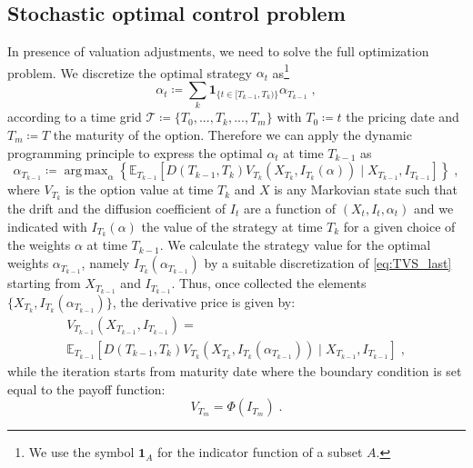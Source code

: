 \documentclass[runningheads]{m2ef}
\DeclareMathOperator*{\argmax}{arg\,max}
\begin{document}
	\subsection{Stochastic optimal control problem}
	In presence of valuation adjustments, we need to solve the full optimization problem. We discretize the optimal strategy $\alpha_t$ as\footnote{We use the symbol $\mathbf{1}_A$ for the indicator function of a subset $A$.}
	\begin{equation}
		\alpha_t \coloneqq \sum_k \mathbf{1}_{ \{t \in [T_{k-1}, T_k)\}}\alpha_{T_{k-1}} \; ,
	\label{eq:piecewise_strategy}\end{equation}
	according to a time grid $\mathcal{T}\coloneqq \{T_0,...,T_k,...,T_m\}$ with $T_0\coloneqq t$ the pricing date and $T_m \coloneqq T$ the maturity of the option. 
	Therefore we can apply the dynamic programming principle to express the optimal $\alpha_t$ at time $T_{k-1}$ as
	\begin{equation}
		\alpha_{T_{k-1}}\coloneqq \argmax_{\alpha} \left\{\mathbb{E}_{T_{k-1}}\left[D\left(T_{k-1},T_{k} \right) V_{T_{k}}\left(X_{T_{k}}, I_{T_{k}}(\alpha)\right) \mid X_{T_{k-1}}, I_{T_{k-1}}\right]\right\} \; ,
	\label{eq:recursion}\end{equation}
	where $V_{T_k}$ is the option value at time $T_k$ and $X$ is any Markovian state such that the drift and the diffusion coefficient of $I_t$ are a function of $\left(X_t,I_t,\alpha_t\right)$ and we indicated with $I_{T_k}\left(\alpha\right)$ the value of the strategy at time $T_{k}$ for a given choice of the weights $\alpha$ at time $T_{k-1}$. We calculate the strategy value for the optimal weights $\alpha_{T_{k-1}}$, namely $I_{T_k}\left(\alpha_{T_{k-1}}\right)$ by a suitable discretization of \eqref{eq:TVS_last} starting from $X_{T_{k-1}}$ and $I_{T_{k-1}}$.
	Thus, once collected the elements $\{X_{T_{k}}, I_{T_{k}}\left(\alpha_{T_{k-1}}\right)\}$, the derivative price is given by:
	\begin{equation}
	\begin{aligned}
			V_{T_{k-1}}\left(X_{T_{k-1}}, I_{T_{k-1}}\right)= \\ 
			\mathbb{E}_{T_{k-1}}\left[D\left(T_{k-1},T_{k}\right) V_{T_{k}}\left(X_{T_{k}}, I_{T_{k}}\left(\alpha_{T_{k-1}}\right)\right) \mid X_{T_{k-1}}, I_{T_{k-1}}\right] \; ,
	\end{aligned}
	\label{eq:recursion2}\end{equation}
	while the iteration starts from maturity date where the boundary condition is set equal to the payoff function:
	\begin{equation}
		V_{T_m} = \Phi\left(I_{T_m}\right) \; .
	\end{equation}
\end{document}
